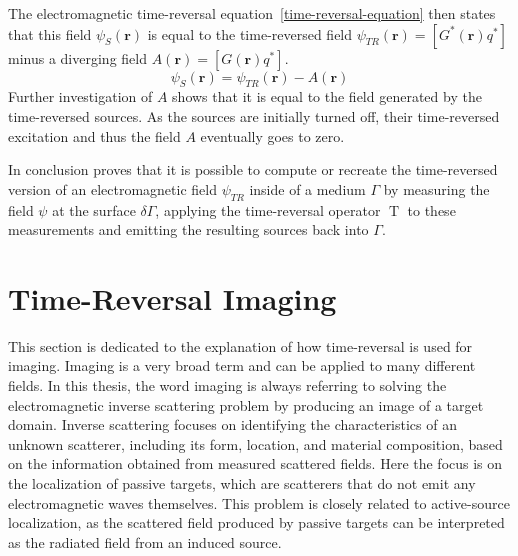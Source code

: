 The electromagnetic time-reversal equation~\eqref{time-reversal-equation} then states that this field \(\psi_S(\mathbf{r})\) is equal to the time-reversed field \(\psi_{TR}(\mathbf{r}) = [G^*(\mathbf{r}) q^*]\) minus a diverging field \(A(\mathbf{r}) = [G(\mathbf{r}) q^*]\).
\begin{equation}
    \psi_S(\mathbf{r}) = \psi_{TR}(\mathbf{r}) - A(\mathbf{r})
\end{equation}
Further investigation of \(A\) shows that it is equal to the field generated by the time-reversed sources.
As the sources are initially turned off, their time-reversed excitation and thus the field \(A\) eventually goes to zero.

In conclusion \parencite{de_rosny_theory_2010} proves that it is possible to compute or recreate the time-reversed version of an electromagnetic field \(\psi_{TR}\) inside of a medium \(\Gamma \) by measuring the field \(\psi \) at the surface \(\delta \Gamma \), applying the time-reversal operator \(\operatorname{T}\) to these measurements and emitting the resulting sources back into \(\Gamma \).



\section{Time-Reversal Imaging}
This section is dedicated to the explanation of how time-reversal is used for imaging.
Imaging is a very broad term and can be applied to many different fields.
In this thesis, the word imaging is always referring to solving the electromagnetic inverse scattering problem by producing an image of a target domain.
Inverse scattering focuses on identifying the characteristics of an unknown scatterer, including its form, location, and material composition, based on the information obtained from measured scattered fields.
Here the focus is on the localization of passive targets, which are scatterers that do not emit any electromagnetic waves themselves.
This problem is closely related to active-source localization, as the scattered field produced by passive targets can be interpreted as the radiated field from an induced source.~\parencite{chen_computational_2018}

